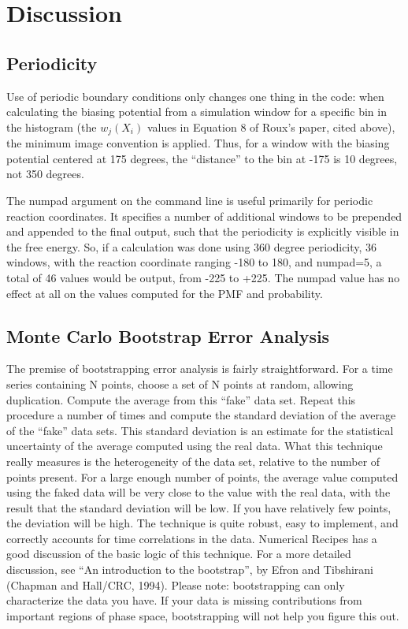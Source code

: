 \documentclass[12pt]{article}
\begin{document}
\section{Discussion}

\subsection{Periodicity}

Use of periodic boundary conditions only changes one thing in the
code: when calculating the biasing potential from a simulation window for a
specific bin in the histogram (the $w_j(X_i)$ values in Equation 8 of Roux's
paper, cited above), the minimum image convention is applied.  Thus, for a
window with the biasing potential centered at 175 degrees, the ``distance''
to the bin at -175 is 10 degrees, not 350 degrees.

The numpad argument on the command line is useful primarily for periodic
reaction coordinates.  It specifies a number of additional windows to be
prepended and appended to the final output, such that the periodicity is
explicitly visible in the free energy.  So, if a calculation was done using
360 degree periodicity, 36 windows, with the reaction coordinate ranging
-180 to 180, and numpad=5, a total of 46 values would be output, from -225
to +225.  The numpad value has no effect at all on the values computed for
the PMF and probability.

\subsection{Monte Carlo Bootstrap Error Analysis}
\label{ss:bootstrap}

The premise of bootstrapping error analysis is fairly straightforward.  For
a time series containing N points, choose a set of N points at random,
allowing duplication.  Compute the average from this ``fake'' data set.
Repeat this procedure a number of times and compute the standard deviation
of the average of the ``fake'' data sets.  This standard deviation is an
estimate for the statistical uncertainty of the average computed using the
real data.  What this technique really measures is the heterogeneity of the
data set, relative to the number of points present.  For a large enough
number of points, the average value computed using the faked data will be
very close to the value with the real data, with the result that the
standard deviation will be low.  If you have relatively few points, the
deviation will be high.  The technique is quite robust, easy to implement,
and correctly accounts for time correlations in the data.  Numerical
Recipes has a good discussion of the basic logic of this technique.  For a
more detailed discussion, see ``An introduction to the bootstrap'', by Efron
and Tibshirani (Chapman and Hall/CRC, 1994).  Please note: bootstrapping can
only characterize the data you have.  If your data is missing contributions
from important regions of phase space, bootstrapping will not help you figure
this out.  
\end{document}
